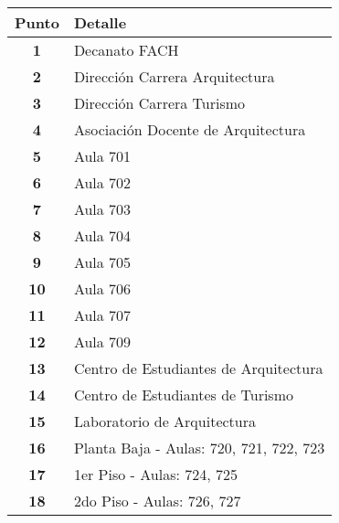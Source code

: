     \begin{longtable}{ c  X }
      \toprule
        \textbf{Punto} &
        \textbf{Detalle}\\

      \midrule
      \endhead

  \textbf{1}
  &
  Decanato FACH
  \\

  \textbf{2}
  &
  Dirección Carrera Arquitectura
  \\

  \textbf{3}
  &
  Dirección Carrera Turismo
  \\

  \textbf{4}
  &
  Asociación Docente de Arquitectura
  \\

\textbf{5}
&
Aula 701
\\

\textbf{6}
&
Aula 702
\\

\textbf{7}
&
Aula 703
\\

\textbf{8}
&
Aula 704
\\

\textbf{9}
&
Aula 705
\\

\textbf{10}
&
Aula 706
\\

\textbf{11}
&
Aula 707
\\


\textbf{12}
&
Aula 709
\\


\textbf{13}
&
Centro de Estudiantes de Arquitectura
\\

\textbf{14}
&
Centro de Estudiantes de Turismo
\\


\textbf{15}
&
Laboratorio de Arquitectura
\\

\textbf{16}
&
Planta Baja - Aulas: 720, 721, 722, 723
\\

\textbf{17}
&
1{\tiny er} Piso - Aulas: 724, 725
\\

\textbf{18}
&
2{\tiny do} Piso - Aulas: 726, 727
\\



\end{longtable}
